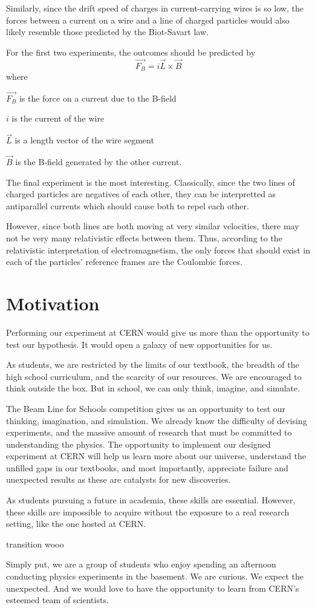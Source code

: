\documentclass[12pt,letterpaper]{article}
\begin{document}
Similarly, since the drift speed of charges in current-carrying wires is so low, the forces between a current on a wire and a line of charged particles would also likely resemble those predicted by the Biot-Savart law.

For the first two experiments, the outcomes should be predicted by \[ %
	\vec{F_B} = i\vec{L}\times \vec{B}
\]
where
\begin{description}
	\item $\vec{F_B}$ is the force on a current due to the B-field
	\item $i$ is the current of the wire
	\item $\vec{L}$ is a length vector of the wire segment
	\item $\vec{B}$ is the B-field generated by the other current.
\end{description}

The final experiment is the most interesting. Classically, since the two lines of charged particles are negatives of each other, they can be interpretted as antiparallel currents which should cause both to repel each other.

However, since both lines are both moving at very similar velocities, there may not be very many relativistic effects between them. Thus, according to the relativistic interpretation of electromagnetism, the only forces that should exist in each of the particles' reference frames are the Coulombic forces.

\section{Motivation}
Performing our experiment at CERN would give us more than the opportunity to test our hypothesis. It would open a galaxy of new opportunities for us.

As students, we are restricted by the limits of our textbook, the breadth of the high school curriculum, and the scarcity of our resources. We are encouraged to think outside the box. But in school, we can only think, imagine, and simulate.

The Beam Line for Schools competition gives us an opportunity to    test our thinking, imagination, and simulation. We already know the difficulty of devising experiments, and the massive amount of research that must be committed to understanding the physics. The opportunity to implement our designed experiment at CERN will help us learn more about our universe, understand the unfilled gaps in our textbooks, and most importantly, appreciate failure and unexpected results as these are catalysts for new discoveries.

As students pursuing a future in academia, these skills are essential. However, these skills are impossible to acquire without the exposure to a real research setting, like the one hosted at CERN.

transition wooo

Simply put, we are a group of students who enjoy spending an afternoon conducting physics experiments in the basement. We are curious. We expect the unexpected. And we would love to have the opportunity to learn from CERN’s esteemed team of scientists.
\end{document}
